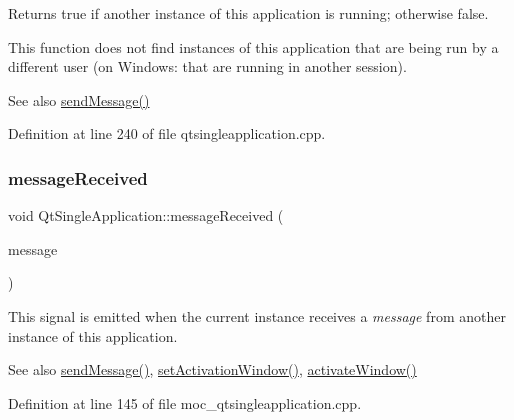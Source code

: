 Returns true if another instance of this application is running; otherwise false.

This function does not find instances of this application that are being run by a different user (on Windows\+: that are running in another session).

\begin{DoxySeeAlso}{See also}
\hyperlink{class_qt_single_application_a0e2f3900f0290913c738ec6b4b959922}{send\+Message()} 
\end{DoxySeeAlso}


Definition at line 240 of file qtsingleapplication.\+cpp.

\mbox{\label{class_qt_single_application_a69340cef3d26d026e11424930e5a5866}} 
\subsubsection{\texorpdfstring{message\+Received}{messageReceived}}
{\footnotesize\ttfamily void Qt\+Single\+Application\+::message\+Received (\begin{DoxyParamCaption}\item[{const Q\+String \&}]{message }\end{DoxyParamCaption})\hspace{0.3cm}{\ttfamily [signal]}}

This signal is emitted when the current instance receives a {\itshape message} from another instance of this application.

\begin{DoxySeeAlso}{See also}
\hyperlink{class_qt_single_application_a0e2f3900f0290913c738ec6b4b959922}{send\+Message()}, \hyperlink{class_qt_single_application_acb5347f6dc6822dbe4d6a78804043528}{set\+Activation\+Window()}, \hyperlink{class_qt_single_application_a0881b32c76132b499f3180064006abc1}{activate\+Window()} 
\end{DoxySeeAlso}


Definition at line 145 of file moc\+\_\+qtsingleapplication.\+cpp.

\mbox{\label{class_qt_single_application_a0e2f3900f0290913c738ec6b4b959922}} 
